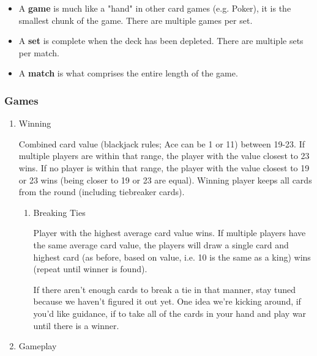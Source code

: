 \documentclass[11pt]{article}
\begin{document}
\begin{itemize}
\item A \textbf{game} is much like a "hand" in other card games (e.g. Poker), it is
the smallest chunk of the game. There are multiple games per set.
\item A \textbf{set} is complete when the deck has been depleted. There are
multiple sets per match.
\item A \textbf{match} is what comprises the entire length of the game.
\end{itemize}

\subsubsection{Games}
\label{sec-2-2-2}
\begin{enumerate}
\item Winning
\label{sec-2-2-2-1}

Combined card value (blackjack rules; Ace can be 1 or 11) between
19-23. If multiple players are within that range, the player with the
value closest to 23 wins. If no player is within that range, the
player with the value closest to 19 or 23 wins (being closer to 19 or
23 are equal). Winning player keeps all cards from the round
(including tiebreaker cards). 

\begin{enumerate}
\item Breaking Ties
\label{sec-2-2-2-1-1}

Player with the highest average card value wins. If multiple players
have the same average card value, the players will draw a single card
and highest card (as before, based on value, i.e. 10 is the same as a
king) wins (repeat until winner is found). 

If there aren't enough cards to break a tie in that manner, stay tuned
because we haven't figured it out yet. One idea we're kicking around,
if you'd like guidance, if to take all of the cards in your hand and
play war until there is a winner.
\end{enumerate}

\item Gameplay
\label{sec-2-2-2-2}


\end{enumerate}
\end{document}

